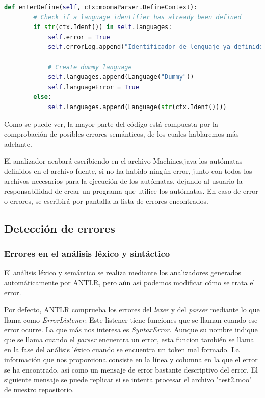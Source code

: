 \documentclass{pre-tfg}
\begin{document}
\begin{lstlisting}[caption=Función enterDefine., language=Python]
def enterDefine(self, ctx:moomaParser.DefineContext):
        # Check if a language identifier has already been defined
        if str(ctx.Ident()) in self.languages:
            self.error = True
            self.errorLog.append("Identificador de lenguaje ya definido: {}".format(str(ctx.Ident())))

            # Create dummy language
            self.languages.append(Language("Dummy"))
            self.languageError = True
        else:
            self.languages.append(Language(str(ctx.Ident())))
\end{lstlisting}

Como se puede ver, la mayor parte del código está compuesta por la comprobación de posibles errores semánticos, de los cuales hablaremos más adelante.

El analizador acabará escribiendo en el archivo Machines.java los autómatas definidos en el archivo fuente, si no ha habido ningún error, junto con todos los archivos necesarios para la ejecución de los autómatas, dejando al usuario la responsabilidad de crear un programa que utilice los autómatas. En caso de error o errores, se escribirá por pantalla la lista de errores encontrados.

\subsection{Detección de errores}
\subsubsection{Errores en el análisis léxico y sintáctico}
El análisis léxico y semántico se realiza mediante los analizadores generados automáticamente por ANTLR, pero aún así podemos modificar cómo se trata el error. 

Por defecto, ANTLR comprueba los errores del \textit{lexer} y del \textit{parser} mediante lo que llama como \textit{ErrorListener}. Este listener tiene funciones que se llaman cuando ese error ocurre. La que más nos interesa es \textit{SyntaxError}. Aunque su nombre indique que se llama cuando el \textit{parser} encuentra un error, esta funcion también se llama en la fase del análisis léxico cuando se encuentra un token mal formado. La información que nos proporciona consiste en la línea y columna en la que el error se ha encontrado, así como un mensaje de error bastante descriptivo del error. El siguiente mensaje se puede replicar si se intenta procesar el archivo "test2.moo" de nuestro repositorio.
\end{document}
